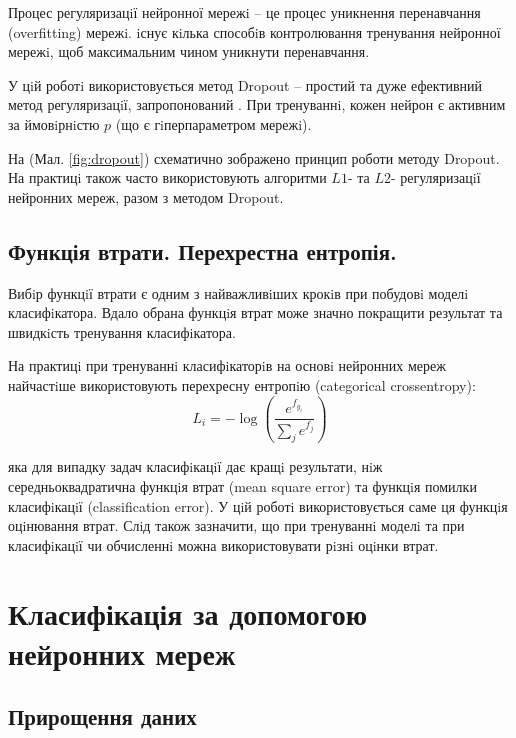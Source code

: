 Процес регуляризацiї нейронної мережi -- це процес уникнення перенавчання (overfitting) мережi. iснує кiлька способiв контролювання тренування нейронної мережi, щоб максимальним чином уникнути перенавчання.

У цiй роботi використовується метод Dropout -- простий та дуже ефективний метод регуляризацiї, запропонований \parencite{nn:dropout}. При тренуваннi, кожен нейрон є активним за ймовiрнiстю \(p\) (що є гiперпараметром мережi).

На (Мал. \ref{fig:dropout}) схематично зображено принцип роботи методу Dropout. На практицi також часто використовують алгоритми \(L1\)- та \(L2\)- регуляризацiї нейронних мереж, разом з методом Dropout.

\subsection{Функція втрати. Перехрестна ентропія.}

Вибiр функцiї втрати є одним з найважливiших крокiв при побудовi моделi класифiкатора. Вдало обрана функцiя втрат може значно покращити результат та швидкiсть тренування класифiкатора.

На практицi при тренуваннi класифiкаторiв на основi нейронних мереж найчастiше використовують перехресну ентропiю (categorical crossentropy):
\begin{equation*}
L_i = -\log\left(\frac{e^{f_{y_i}}}{ \sum_j e^{f_j} }\right)
\end{equation*}

яка для випадку задач класифiкацiї дає кращi результати, нiж середньоквадратична функцiя втрат (mean square error) та функцiя помилки класифiкацiї (classification error). У цiй роботi використовується саме ця функцiя оцiнювання втрат. Слiд також зазначити, що при тренуваннi моделi та при класифiкацiї чи обчисленнi можна використовувати рiзнi оцiнки втрат.


\section{Класифікація за допомогою нейронних мереж}


\subsection{Прирощення даних}


